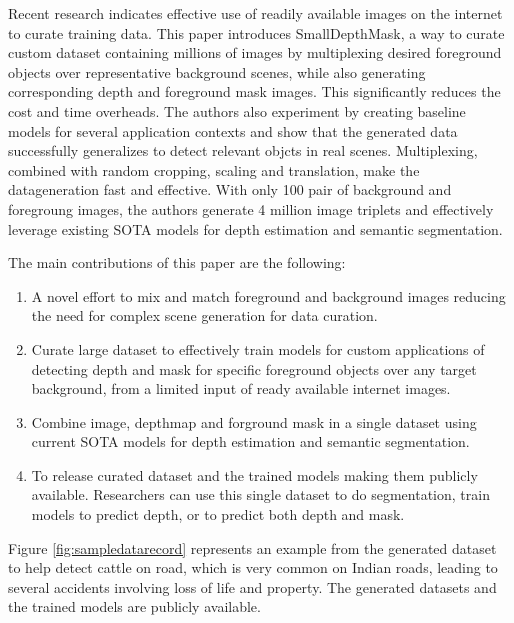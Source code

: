 \documentclass[review]{cvpr}
\begin{document}
Recent research indicates effective use of readily available images on the internet to curate training data.  
This paper introduces SmallDepthMask, 
a way to curate custom dataset containing millions of images by multiplexing desired foreground objects over representative background 
scenes, while also generating corresponding depth and foreground mask images. This significantly reduces the cost and time overheads.
The authors also experiment by creating baseline models for several application contexts and show that the generated data
successfully generalizes to detect relevant objcts in real scenes. Multiplexing, combined with random cropping, scaling 
and translation, make the datageneration fast and effective. With only 100 pair of background and foregroung images, the authors
generate 4 million image triplets and effectively leverage existing SOTA models for depth estimation and semantic segmentation.

The main contributions of this paper are the following:
\begin{enumerate}
\item A novel effort to mix and match foreground and background images reducing the need for complex scene generation for data curation.
\item Curate large dataset to effectively train models for custom applications of detecting depth and mask for specific foreground objects over any target background, from a limited input of ready available internet images.
\item Combine image, depthmap and forground mask in a single dataset using current SOTA models for depth estimation and semantic segmentation.
\item To release curated dataset and the trained models making them publicly available. Researchers can use this single dataset to do segmentation, 
train models to predict depth, or to predict both depth and mask.
\end{enumerate}
  

Figure \ref{fig:sampledatarecord} represents an example from the generated dataset to help detect cattle on road,
 which is very common on Indian roads, leading to several accidents involving loss of life and property. 
 The generated datasets and the trained models are publicly available.


\end{document}
